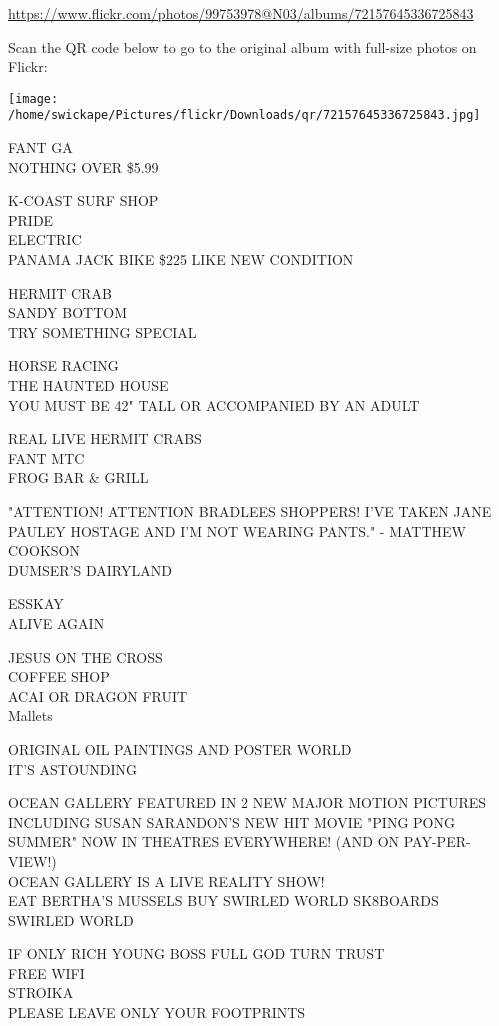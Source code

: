 \documentclass[10pt,letterpaper]{article}
\begin{document}
\url{https://www.flickr.com/photos/99753978@N03/albums/72157645336725843}

Scan the QR code below to go to the original album with full-size photos on Flickr:

\texttt{[image: /home/swickape/Pictures/flickr/Downloads/qr/72157645336725843.jpg]}
\pagebreak

FANT GA\\
NOTHING OVER \$5.99

K{-}COAST SURF SHOP\\
PRIDE\\
ELECTRIC\\
PANAMA JACK BIKE \$225 LIKE NEW CONDITION

HERMIT CRAB\\
SANDY BOTTOM\\
TRY SOMETHING SPECIAL

HORSE RACING\\
THE HAUNTED HOUSE\\
YOU MUST BE 42" TALL OR ACCOMPANIED BY AN ADULT

REAL LIVE HERMIT CRABS\\
FANT MTC\\
FROG BAR \& GRILL

"ATTENTION!  ATTENTION BRADLEES SHOPPERS!  I'VE TAKEN JANE PAULEY HOSTAGE AND I'M NOT WEARING PANTS." {-} MATTHEW COOKSON\\
DUMSER'S DAIRYLAND

ESSKAY\\
ALIVE AGAIN

JESUS ON THE CROSS\\
COFFEE SHOP\\
ACAI OR DRAGON FRUIT\\
Mallets

ORIGINAL OIL PAINTINGS AND POSTER WORLD\\
IT'S ASTOUNDING

OCEAN GALLERY FEATURED IN 2 NEW MAJOR MOTION PICTURES INCLUDING SUSAN SARANDON'S NEW HIT MOVIE "PING PONG SUMMER" NOW IN THEATRES EVERYWHERE!  (AND ON PAY{-}PER{-}VIEW!)\\
OCEAN GALLERY IS A LIVE REALITY SHOW!\\
EAT BERTHA'S MUSSELS BUY SWIRLED WORLD SK8BOARDS\\
SWIRLED WORLD

IF ONLY RICH YOUNG BOSS FULL GOD TURN TRUST\\
FREE WIFI\\
STROIKA\\
PLEASE LEAVE ONLY YOUR FOOTPRINTS
\end{document}
